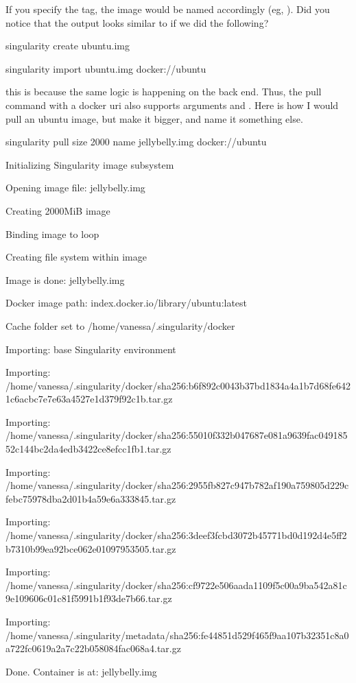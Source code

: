 \documentclass[letterpaper,10pt,english]{sphinxmanual}
\begin{document}
If you specify the tag, the image would be named accordingly (eg, ). Did
you notice that the output looks similar to if we did the following?

%
\begin{sphinxVerbatim}[commandchars=\\\{\}]
singularity create ubuntu.img

singularity import ubuntu.img docker://ubuntu
\end{sphinxVerbatim}

this is because the same logic is happening on the back end. Thus, the
pull command with a docker uri also supports arguments  and  . Here is how I
would pull an ubuntu image, but make it bigger, and name it something
else.

%
\begin{sphinxVerbatim}[commandchars=\\\{\}]
singularity pull \PYGZhy{}\PYGZhy{}size 2000 \PYGZhy{}\PYGZhy{}name jellybelly.img docker://ubuntu

Initializing Singularity image subsystem

Opening image file: jellybelly.img

Creating 2000MiB image

Binding image to loop

Creating file system within image

Image is done: jellybelly.img

Docker image path: index.docker.io/library/ubuntu:latest

Cache folder set to /home/vanessa/.singularity/docker

Importing: base Singularity environment

Importing: /home/vanessa/.singularity/docker/sha256:b6f892c0043b37bd1834a4a1b7d68fe6421c6acbc7e7e63a4527e1d379f92c1b.tar.gz

Importing: /home/vanessa/.singularity/docker/sha256:55010f332b047687e081a9639fac04918552c144bc2da4edb3422ce8efcc1fb1.tar.gz

Importing: /home/vanessa/.singularity/docker/sha256:2955fb827c947b782af190a759805d229cfebc75978dba2d01b4a59e6a333845.tar.gz

Importing: /home/vanessa/.singularity/docker/sha256:3deef3fcbd3072b45771bd0d192d4e5ff2b7310b99ea92bce062e01097953505.tar.gz

Importing: /home/vanessa/.singularity/docker/sha256:cf9722e506aada1109f5c00a9ba542a81c9e109606c01c81f5991b1f93de7b66.tar.gz

Importing: /home/vanessa/.singularity/metadata/sha256:fe44851d529f465f9aa107b32351c8a0a722fc0619a2a7c22b058084fac068a4.tar.gz

Done. Container is at: jellybelly.img
\end{sphinxVerbatim}
\end{document}
